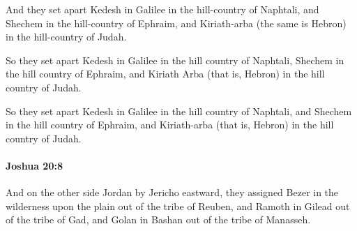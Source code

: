 			\begin{versebox}
					\item[BHS] 
					\item[ASV] And they set apart Kedesh in Galilee in the hill-country of Naphtali, and Shechem in the hill-country of Ephraim, and Kiriath-arba (the same is Hebron) in the hill-country of Judah.
					\item[NIV] So they set apart Kedesh in Galilee in the hill country of Naphtali, Shechem in the hill country of Ephraim, and Kiriath Arba (that is, Hebron) in the hill country of Judah.
					\item[NRSV] So they set apart Kedesh in Galilee in the hill country of Naphtali, and Shechem in the hill country of Ephraim, and Kiriath-arba (that is, Hebron) in the hill country of Judah.
			\end{versebox}

		\paragraph{Joshua 20:8} %
			\label{JOSHUA-20-8}

			And on the other side Jordan by Jericho eastward, they assigned Bezer in the wilderness upon the plain out of the tribe of Reuben, and Ramoth in Gilead out of the tribe of Gad, and Golan in Bashan out of the tribe of Manasseh.

